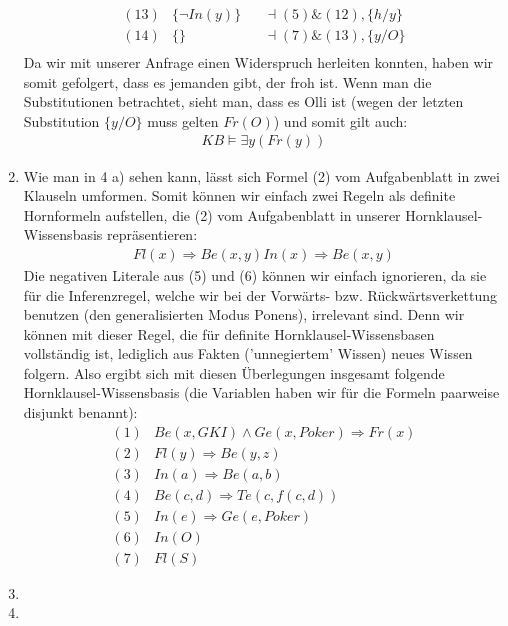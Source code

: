 \documentclass[a4paper,10pt]{article}
\begin{document}
\begin{enumerate}[~~a)]
\begin{align*}
(13) &\{\lnot In(y)\} &&\dashv (5) \& (12), \{h/y\}\\
(14) &\{\} && \dashv (7) \& (13), \{y/O\}\\
\end{align*}
Da wir mit unserer Anfrage einen Widerspruch herleiten konnten, haben wir somit gefolgert, dass es jemanden gibt, der froh ist. Wenn man die Substitutionen betrachtet, sieht man, dass es Olli ist (wegen der letzten Substitution $\{y/O\}$ muss gelten $Fr(O)$) und somit gilt auch:
\begin{align*}
KB \vDash \exists y (Fr(y))
\end{align*}
    \item
Wie man in 4 a) sehen kann, lässt sich Formel (2) vom Aufgabenblatt in zwei Klauseln umformen. Somit können wir einfach zwei Regeln als definite Hornformeln aufstellen, die (2) vom Aufgabenblatt in unserer Hornklausel-Wissensbasis repräsentieren:
\begin{align*}
Fl(x) \Rightarrow Be(x,y)
In (x) \Rightarrow Be(x,y)
\end{align*}
Die negativen Literale aus (5) und (6) können wir einfach ignorieren, da sie für die Inferenzregel, welche wir bei der Vorwärts- bzw. Rückwärtsverkettung benutzen (den generalisierten Modus Ponens), irrelevant sind. Denn wir können mit dieser Regel, die für definite Hornklausel-Wissensbasen vollständig ist, lediglich aus Fakten ('unnegiertem' Wissen) neues Wissen folgern.
Also ergibt sich mit diesen Überlegungen insgesamt folgende Hornklausel-Wissensbasis (die Variablen haben wir für die Formeln paarweise disjunkt benannt):
\begin{align*}
(1) &Be(x,GKI)\land Ge(x,Poker) \Rightarrow Fr(x)\\
(2) &Fl(y) \Rightarrow Be(y,z)\\
(3) &In (a) \Rightarrow Be(a,b)\\
(4) &Be(c,d) \Rightarrow Te(c,f(c,d))\\
(5) &In(e) \Rightarrow Ge(e,Poker)\\
(6) &In(O)\\
(7) &Fl(S)
\end{align*}
    \item

    \item
\end{enumerate}
\end{document}
